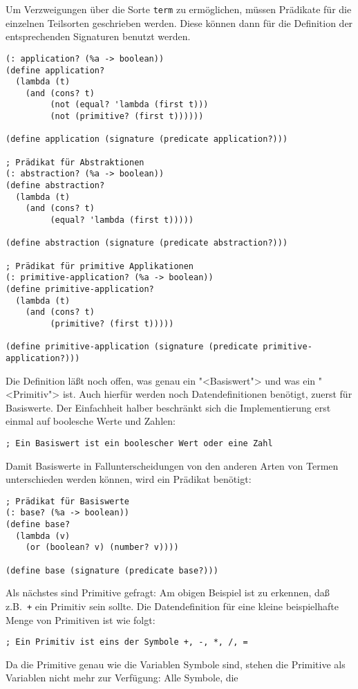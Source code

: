 Um Verzweigungen über die Sorte \texttt{term} zu ermöglichen, müssen
Prädikate für die einzelnen Teilsorten geschrieben werden.  Diese
können dann für die Definition der entsprechenden Signaturen benutzt
werden.
%
\begin{verbatim}
(: application? (%a -> boolean))
(define application?
  (lambda (t)
    (and (cons? t)
         (not (equal? 'lambda (first t)))
         (not (primitive? (first t))))))

(define application (signature (predicate application?)))

; Prädikat für Abstraktionen
(: abstraction? (%a -> boolean))
(define abstraction?
  (lambda (t)
    (and (cons? t)
         (equal? 'lambda (first t)))))

(define abstraction (signature (predicate abstraction?)))

; Prädikat für primitive Applikationen
(: primitive-application? (%a -> boolean))
(define primitive-application?
  (lambda (t)
    (and (cons? t)
         (primitive? (first t)))))

(define primitive-application (signature (predicate primitive-application?)))
\end{verbatim}
%
Die Definition läßt noch offen, was genau ein "<Basiswert"> und was ein
"<Primitiv"> ist.  Auch hierfür werden noch Datendefinitionen
benötigt, zuerst für Basiswerte.  Der Einfachheit halber beschränkt
sich die Implementierung erst einmal auf boolesche Werte und Zahlen:
%
\begin{verbatim}
; Ein Basiswert ist ein boolescher Wert oder eine Zahl
\end{verbatim}
%
Damit Basiswerte in Fallunterscheidungen von den anderen Arten von
Termen unterschieden werden können, wird ein Prädikat benötigt:
%
\begin{verbatim}
; Prädikat für Basiswerte
(: base? (%a -> boolean))
(define base?
  (lambda (v)
    (or (boolean? v) (number? v))))

(define base (signature (predicate base?)))
\end{verbatim}
%
Als nächstes sind Primitive gefragt: Am obigen Beispiel ist zu
erkennen, daß z.B.\ \texttt{+} ein Primitiv sein sollte.  Die
Datendefinition für eine kleine beispielhafte Menge von Primitiven ist
wie folgt:
%
\begin{verbatim}
; Ein Primitiv ist eins der Symbole +, -, *, /, =
\end{verbatim}
%
Da die Primitive genau wie die Variablen Symbole sind, stehen die
Primitive als Variablen nicht mehr zur Verfügung:  Alle Symbole, die
